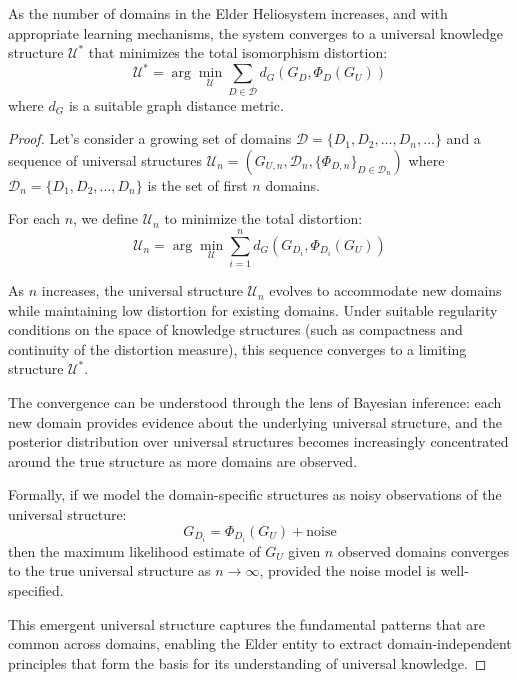 \begin{theorem}
As the number of domains in the Elder Heliosystem increases, and with appropriate learning mechanisms, the system converges to a universal knowledge structure $\mathcal{U}^*$ that minimizes the total isomorphism distortion:
\begin{equation}
\mathcal{U}^* = \arg\min_{\mathcal{U}} \sum_{D \in \mathcal{D}} d_G(G_D, \Phi_D(G_U))
\end{equation}
where $d_G$ is a suitable graph distance metric.
\end{theorem}

\begin{proof}
Let's consider a growing set of domains $\mathcal{D} = \{D_1, D_2, \ldots, D_n, \ldots\}$ and a sequence of universal structures $\mathcal{U}_n = (G_{U,n}, \mathcal{D}_n, \{\Phi_{D,n}\}_{D \in \mathcal{D}_n})$ where $\mathcal{D}_n = \{D_1, D_2, \ldots, D_n\}$ is the set of first $n$ domains.

For each $n$, we define $\mathcal{U}_n$ to minimize the total distortion:
\begin{equation}
\mathcal{U}_n = \arg\min_{\mathcal{U}} \sum_{i=1}^n d_G(G_{D_i}, \Phi_{D_i}(G_U))
\end{equation}

As $n$ increases, the universal structure $\mathcal{U}_n$ evolves to accommodate new domains while maintaining low distortion for existing domains. Under suitable regularity conditions on the space of knowledge structures (such as compactness and continuity of the distortion measure), this sequence converges to a limiting structure $\mathcal{U}^*$.

The convergence can be understood through the lens of Bayesian inference: each new domain provides evidence about the underlying universal structure, and the posterior distribution over universal structures becomes increasingly concentrated around the true structure as more domains are observed.

Formally, if we model the domain-specific structures as noisy observations of the universal structure:
\begin{equation}
G_{D_i} = \Phi_{D_i}(G_U) + \text{noise}
\end{equation}
then the maximum likelihood estimate of $G_U$ given $n$ observed domains converges to the true universal structure as $n \to \infty$, provided the noise model is well-specified.

This emergent universal structure captures the fundamental patterns that are common across domains, enabling the Elder entity to extract domain-independent principles that form the basis for its understanding of universal knowledge.
\end{proof}

